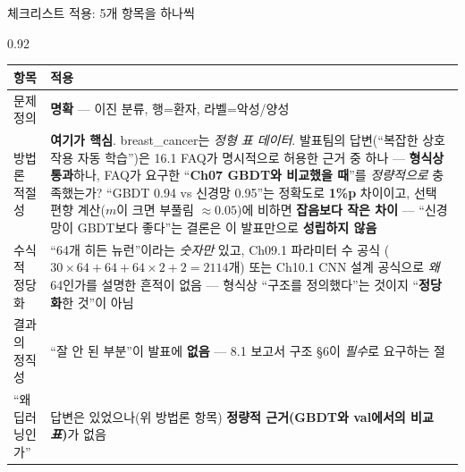 \begin{frame}{체크리스트 적용: 5개 항목을 하나씩}
\begin{center}\begin{varwidth}{0.92\textwidth}
  \small
  \begin{tabular}{@{}p{2.9cm}p{11.7cm}@{}}
    \toprule
    항목 & 적용 \\
    \midrule
    문제 정의 & \textbf{명확} — 이진 분류, 행=환자, 라벨=악성/양성 \\
    방법론 적절성 & \textbf{여기가 핵심}. breast\_cancer는
      \textit{정형 표 데이터}. 발표팀의 답변(``복잡한 상호작용 자동
      학습'')은 16.1 FAQ가 명시적으로 허용한 근거 중 하나 —
      \textbf{형식상 통과}하나, FAQ가 요구한 ``\textbf{Ch07 GBDT와
      비교했을 때}''를 \textit{정량적으로} 충족했는가? ``GBDT 0.94
      vs 신경망 0.95''는 정확도로 \textbf{1\%p} 차이이고, 선택 편향
      계산($m$이 크면 부풀림 $\approx 0.05$)에 비하면
      \textbf{잡음보다 작은 차이} — ``신경망이 GBDT보다 좋다''는
      결론은 이 발표만으로 \textbf{성립하지 않음} \\
    수식적 정당화 & ``64개 히든 뉴런''이라는 \textit{숫자만} 있고,
      Ch09.1 파라미터 수 공식 ($30\times64 + 64 + 64\times2 + 2 =
      2114$개) 또는 Ch10.1 CNN 설계 공식으로 \textit{왜} 64인가를
      설명한 흔적이 없음 — 형식상 ``구조를 정의했다''는 것이지
      ``\textbf{정당화}한 것''이 아님 \\
    결과의 정직성 & ``잘 안 된 부분''이 발표에 \textbf{없음} —
      8.1 보고서 구조 §6이 \textit{필수}로 요구하는 절 \\
    ``왜 딥러닝인가'' & 답변은 있었으나(위 방법론 항목)
      \textbf{정량적 근거(GBDT와 val에서의 비교 \textit{표})}가
      없음 \\
    \bottomrule
  \end{tabular}
\end{varwidth}\end{center}
\end{frame}
